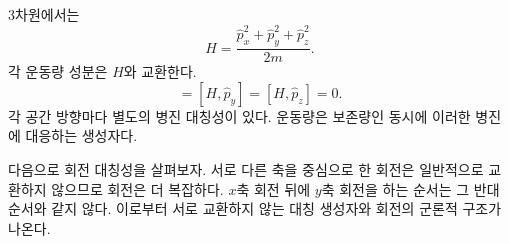 3차원에서는
\begin{equation}
H
=
\frac{\hat p_x^2+\hat p_y^2+\hat p_z^2}{2m}.
\end{equation}
각 운동량 성분은 \(H\)와 교환한다.
\begin{equation}
[H,\hat p_x]=[H,\hat p_y]=[H,\hat p_z]=0.
\end{equation}
각 공간 방향마다 별도의 병진 대칭성이 있다. 운동량은 보존량인 동시에 이러한 병진에 대응하는 생성자다.

다음으로 회전 대칭성을 살펴보자. 서로 다른 축을 중심으로 한 회전은 일반적으로 교환하지 않으므로 회전은 더 복잡하다. \(x\)축 회전 뒤에 \(y\)축 회전을 하는 순서는 그 반대 순서와 같지 않다. 이로부터 서로 교환하지 않는 대칭 생성자와 회전의 군론적 구조가 나온다.
